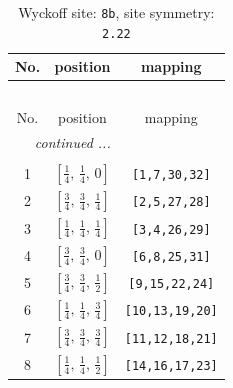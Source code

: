 \documentclass[fleqn,8pt]{jsarticle}
\begin{document}
\begin{longtable}{ccc}
\caption{Wyckoff site: {\tt 8b}, site symmetry: {\tt 2.22}}
 \\
 \hline \hline
No. & position & mapping \\ \hline \endfirsthead

\multicolumn{2}{l}{\tablename\ \thetable{}} \\
 \hline \hline
No. & position & mapping \\ \hline \endhead

 \hline \hline
\multicolumn{2}{r}{\footnotesize\it continued ...} \\ \endfoot

 \hline \hline
\multicolumn{2}{r}{} \\ \endlastfoot

1 & $\left[ \frac{1}{4},\, \frac{1}{4},\, 0 \right]$ & {\tt [1,7,30,32]} \\ \hline
2 & $\left[ \frac{3}{4},\, \frac{3}{4},\, \frac{1}{4} \right]$ & {\tt [2,5,27,28]} \\ \hline
3 & $\left[ \frac{1}{4},\, \frac{1}{4},\, \frac{1}{4} \right]$ & {\tt [3,4,26,29]} \\ \hline
4 & $\left[ \frac{3}{4},\, \frac{3}{4},\, 0 \right]$ & {\tt [6,8,25,31]} \\ \hline
5 & $\left[ \frac{3}{4},\, \frac{3}{4},\, \frac{1}{2} \right]$ & {\tt [9,15,22,24]} \\ \hline
6 & $\left[ \frac{1}{4},\, \frac{1}{4},\, \frac{3}{4} \right]$ & {\tt [10,13,19,20]} \\ \hline
7 & $\left[ \frac{3}{4},\, \frac{3}{4},\, \frac{3}{4} \right]$ & {\tt [11,12,18,21]} \\ \hline
8 & $\left[ \frac{1}{4},\, \frac{1}{4},\, \frac{1}{2} \right]$ & {\tt [14,16,17,23]} \\
\end{longtable}
\renewcommand{\arraystretch}{1.2}
\end{document}
